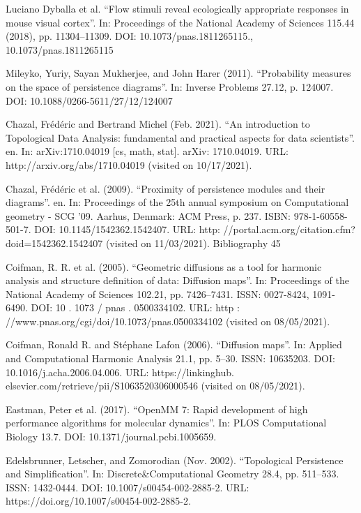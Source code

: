 \documentclass[9pt,conference]{IEEEtran}
\begin{document}
\begin{thebibliography}{1}
Luciano Dyballa et al. “Flow stimuli reveal ecologically appropriate responses in mouse visual cortex”. In: Proceedings of the National Academy of Sciences 115.44 (2018), pp. 11304–11309. DOI: 10.1073/pnas.1811265115., 10.1073/pnas.1811265115

Mileyko, Yuriy, Sayan Mukherjee, and John Harer (2011). “Probability measures on the space of persistence diagrams”. In: Inverse Problems 27.12, p. 124007. DOI: 10.1088/0266-5611/27/12/124007

Chazal, Frédéric and Bertrand Michel (Feb. 2021). “An introduction to Topological Data Analysis: fundamental and practical aspects for data scientists”. en. In: arXiv:1710.04019 [cs, math, stat]. arXiv: 1710.04019. URL: http://arxiv.org/abs/1710.04019 (visited on 10/17/2021).

Chazal, Frédéric et al. (2009). “Proximity of persistence modules and their diagrams”. en. In: Proceedings of the 25th annual symposium on Computational geometry - SCG ’09. Aarhus, Denmark: ACM Press, p. 237. ISBN: 978-1-60558-501-7. DOI: 10.1145/1542362.1542407. URL: http: //portal.acm.org/citation.cfm?doid=1542362.1542407 (visited on 11/03/2021). Bibliography 45

Coifman, R. R. et al. (2005). “Geometric diffusions as a tool for harmonic analysis and structure definition of data: Diffusion maps”. In: Proceedings of the National Academy of Sciences 102.21, pp. 7426–7431. ISSN: 0027-8424, 1091-6490. DOI: 10 . 1073 / pnas . 0500334102. URL: http : //www.pnas.org/cgi/doi/10.1073/pnas.0500334102 (visited on 08/05/2021).

Coifman, Ronald R. and Stéphane Lafon (2006). “Diffusion maps”. In: Applied and Computational Harmonic Analysis 21.1, pp. 5–30. ISSN: 10635203. DOI: 10.1016/j.acha.2006.04.006. URL: https://linkinghub. elsevier.com/retrieve/pii/S1063520306000546 (visited on 08/05/2021).

Eastman, Peter et al. (2017). “OpenMM 7: Rapid development of high performance algorithms for molecular dynamics”. In: PLOS Computational Biology 13.7. DOI: 10.1371/journal.pcbi.1005659. 

Edelsbrunner, Letscher, and Zomorodian (Nov. 2002). “Topological Persistence and Simplification”. In: Discrete&Computational Geometry 28.4, pp. 511–533. ISSN: 1432-0444. DOI: 10.1007/s00454-002-2885-2. URL: https://doi.org/10.1007/s00454-002-2885-2.


\end{thebibliography}
\end{document}
